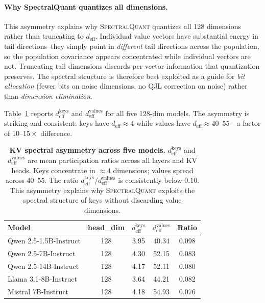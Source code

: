 \documentclass[11pt]{article}
\newcommand{\deff}{d_{\mathrm{eff}}}
\newcommand{\SQ}{\textsc{SpectralQuant}}
\begin{document}
\paragraph{Why SpectralQuant quantizes all dimensions.}
This asymmetry explains why \SQ{} quantizes all 128 dimensions rather than
truncating to $\deff$.  Individual value vectors have substantial energy in tail
directions--they simply point in \emph{different} tail directions across the
population, so the population covariance appears concentrated while individual
vectors are not.  Truncating tail dimensions discards per-vector information
that quantization preserves.  The spectral structure is therefore best exploited
as a guide for \emph{bit allocation} (fewer bits on noise dimensions, no QJL
correction on noise) rather than \emph{dimension elimination}.

Table~\ref{tab:kv_asymmetry} reports $\deff^{\mathrm{keys}}$ and
$\deff^{\mathrm{values}}$ for all five 128-dim models.  The asymmetry is
striking and consistent: keys have $\deff \approx 4$ while values have
$\deff \approx 40$--$55$---a factor of $10$--$15\times$ difference.

\begin{table}[!htbp]
\centering
\caption{\textbf{KV spectral asymmetry across five models.}  $\deff^{\mathrm{keys}}$
and $\deff^{\mathrm{values}}$ are mean participation ratios across all layers
and KV heads.  Keys concentrate in $\approx 4$ dimensions; values spread
across $40$--$55$.  The ratio $\deff^{\mathrm{keys}} / \deff^{\mathrm{values}}$
is consistently below 0.10.  This asymmetry explains why \SQ{} exploits the
spectral structure of keys without discarding value dimensions.}
\label{tab:kv_asymmetry}
\footnotesize
\begin{tabular}{lcccc}
\toprule
\textbf{Model} & \textbf{head\_dim} & $\deff^{\mathrm{keys}}$ & $\deff^{\mathrm{values}}$ & \textbf{Ratio} \\
\midrule
Qwen 2.5-1.5B-Instruct & 128 & 3.95 & 40.34 & 0.098 \\
Qwen 2.5-7B-Instruct   & 128 & 4.30 & 52.15 & 0.083 \\
Qwen 2.5-14B-Instruct  & 128 & 4.17 & 52.11 & 0.080 \\
Llama 3.1-8B-Instruct  & 128 & 3.64 & 44.21 & 0.082 \\
Mistral 7B-Instruct    & 128 & 4.18 & 54.93 & 0.076 \\
\bottomrule
\end{tabular}
\end{table}
\end{document}
